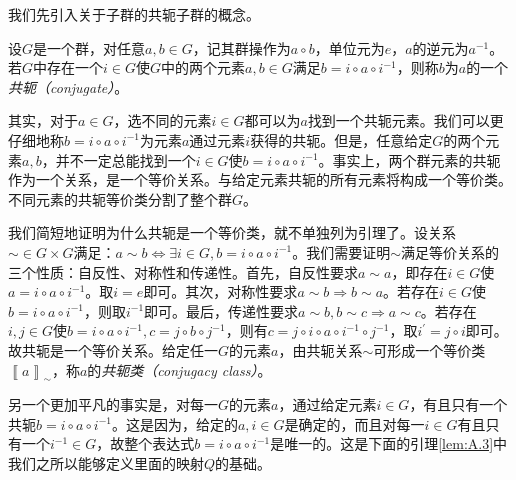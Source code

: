 \documentclass[../main.tex]{subfiles}
\begin{document}
我们先引入关于子群的共轭子群的概念。

\begin{definition}\label{def:A.8}
    设$G$是一个群，对任意$a,b\in G$，记其群操作为$a\circ b$，单位元为$e$，$a$的逆元为$a^{-1}$。若$G$中存在一个$i\in G$使$G$中的两个元素$a,b\in G$满足$b=i\circ a\circ i^{-1}$，则称$b$为$a$的一个\emph{共轭（conjugate）}。
\end{definition}

其实，对于$a\in G$，选不同的元素$i\in G$都可以为$a$找到一个共轭元素。我们可以更仔细地称$b=i\circ a\circ i^{-1}$为元素$a$通过元素$i$获得的共轭。但是，任意给定$G$的两个元素$a,b$，并不一定总能找到一个$i\in G$使$b=i\circ a\circ i^{-1}$。事实上，两个群元素的共轭作为一个关系，是一个等价关系。与给定元素共轭的所有元素将构成一个等价类。不同元素的共轭等价类分割了整个群$G$。

我们简短地证明为什么共轭是一个等价类，就不单独列为引理了。设关系$\sim\in G\times G$满足：$a\sim b\Leftrightarrow\exists i\in G,b=i\circ a\circ i^{-1}$。我们需要证明$\sim$满足等价关系的三个性质：自反性、对称性和传递性。首先，自反性要求$a\sim a$，即存在$i\in G$使$a=i\circ a\circ i^{-1}$。取$i=e$即可。其次，对称性要求$a\sim b\Rightarrow b\sim a$。若存在$i\in G$使$b=i\circ a\circ i^{-1}$，则取$i^{-1}$即可。最后，传递性要求$a\sim b,b\sim c\Rightarrow a\sim c$。若存在$i,j\in G$使$b=i\circ a\circ i^{-1},c=j\circ b\circ j^{-1}$，则有$c=j\circ i\circ a\circ i^{-1}\circ j^{-1}$，取$i^\prime=j\circ i$即可。故共轭是一个等价关系。给定任一$G$的元素$a$，由共轭关系$\sim$可形成一个等价类$\left\llbracket a\right\rrbracket_\sim$，称$a$的\emph{共轭类（conjugacy class）}。

另一个更加平凡的事实是，对每一$G$的元素$a$，通过给定元素$i\in G$，有且只有一个共轭$b=i\circ a\circ i^{-1}$。这是因为，给定的$a, i\in G$是确定的，而且对每一$i\in G$有且只有一个$i^{-1}\in G$，故整个表达式$b=i\circ a\circ i^{-1}$是唯一的。这是下面的引理\ref{lem:A.3}中我们之所以能够定义里面的映射$Q$的基础。
\end{document}
